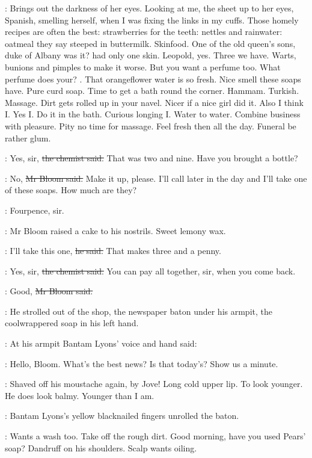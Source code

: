 \BloomInt:
Brings out the darkness of her eyes.
Looking at me,
the sheet up to her eyes,
Spanish,
smelling herself,
when I was fixing the links in my cuffs.
Those homely recipes are often the best:
strawberries for the teeth:
nettles and rainwater:
oatmeal they say steeped in buttermilk.
Skinfood.
One of the old queen's sons,
duke of Albany was it?
had only one skin.
Leopold, yes.
Three we have.
Warts, bunions and pimples to make it worse.
But you want a perfume too.
What perfume does your?
.
That orangeflower water is so fresh.
Nice smell these soaps have.
Pure curd soap.
Time to get a bath round the corner.
Hammam.
Turkish.
Massage.
Dirt gets rolled up in your navel.
Nicer if a nice girl did it.
Also I think I.
Yes I.
Do it in the bath.
Curious longing I.
Water to water.
Combine business with pleasure.
Pity no time for massage.
Feel fresh then all the day.
Funeral be rather glum.

\sweny:
Yes, sir,
\sout{the chemist said.}
That was two and nine.
Have you brought a bottle?

\Bloom:
No,
\sout{Mr Bloom said.}
Make it up, please.
I'll call later in the day
and I'll take one of these soaps.
How much are they?

\sweny:
Fourpence, sir.

:
Mr Bloom raised a cake to his nostrils.
Sweet lemony wax.

\Bloom:
I'll take this one,
\sout{he said.}
That makes three and a penny.

\sweny:
Yes, sir,
\sout{the chemist said.}
You can pay all together, sir, when you come back.

\Bloom:
Good,
\sout{Mr Bloom said.}

:
He strolled out of the shop,
the newspaper baton under his armpit,
the coolwrappered soap in his left hand.

:
At his armpit
Bantam Lyons' voice and hand said:

\lyons:
Hello, Bloom.
What's the best news?
Is that today's?
Show us a minute.

\BloomInt:
Shaved off his moustache again, by Jove!
Long cold upper lip.
To look younger.
He does look balmy.
Younger than I am.

:
Bantam Lyons's yellow blacknailed fingers unrolled the baton.

\BloomInt:
Wants a wash too.
Take off the rough dirt.
Good morning, have you used Pears' soap?
Dandruff on his shoulders.
Scalp wants oiling.

